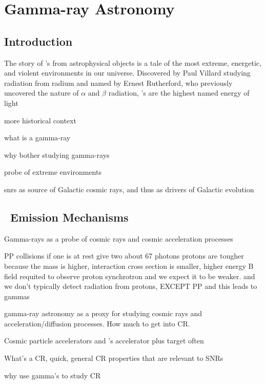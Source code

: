 \chapter{Gamma-ray Astronomy }
\label{chap:gamAstr}

\section{Introduction}\label{gamAstr:intro}
The story of \gam 's from astrophysical objects is a tale of the most extreme, energetic, and violent environments in our universe. Discovered by Paul Villard studying radiation from radium and named by Ernest Rutherford, who previously uncovered the nature of $\alpha$ and $\beta$ radiation, \gam's are the highest named energy of light 

more historical context 

what is a gamma-ray

why bother studying gamma-rays

probe of extreme environments

snrs as source of Galactic cosmic rays, and thus as drivers of Galactic evolution

\section{\gam~Emission Mechanisms }\label{gamAstr:Emiss}

\cite{Sturner97}
\cite{Gaisser98}
Gamma-rays as a probe of cosmic rays and cosmic acceleration processes

PP collisions if one is at rest give two about 67\mev{} photons
protons are tougher because the mass is higher, interaction cross section is smaller, higher energy B field requited to observe proton synchrotron and we expect it to be weaker.  and we don't typically detect radiation from protons, EXCEPT PP and this leads to gammas

gamma-ray astronomy as  a proxy for studying cosmic rays and acceleration/diffusion processes. How much to get into CR. 

Cosmic particle accelerators and \gam's
accelerator plus target often 


What's a CR, quick,  general CR properties that are relevant to SNRs

why use gamma's  to study CR

